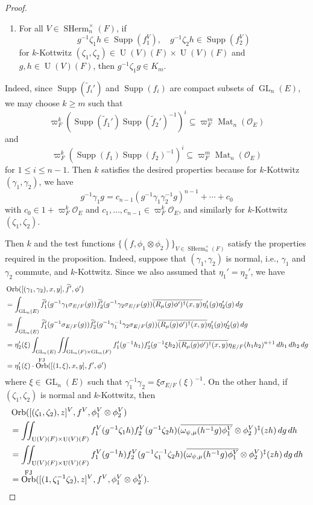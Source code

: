 \documentclass[11pt, reqno]{amsart}
\numberwithin{equation}{subsection}
\theoremstyle{plain}
\theoremstyle{definition}
\newcommand{\wt}{\widetilde}
\renewcommand{\O}{\mathcal O}
\newcommand{\ol}{\overline}
\DeclareMathOperator{\GL}{GL}
\DeclareMathOperator{\Mat}{Mat}
\DeclareMathOperator{\Orb}{Orb}
\DeclareMathOperator{\SHerm}{SHerm}
\DeclareMathOperator{\Supp}{Supp}
\DeclareMathOperator{\U}{U}
\newcommand{\FJ}{\textnormal{FJ}}
\begin{document}
\begin{proof}
\begin{enumerate}[(1)]
\item 
For all $V \in \SHerm_n^\times(F)$, if 
\[
    g^{-1}\zeta_1 h \in \Supp(f_1^V),\quad
    g^{-1}\zeta_2 h \in \Supp(f_2^V)
\]
for $k$-Kottwitz $(\zeta_1, \zeta_2)
\in \U(V)(F) \times \U(V)(F)$ and
$g, h \in \U(V)(F)$, 
then $g^{-1}\zeta_1 g \in K_m$.
\end{enumerate}
Indeed, since $\Supp(\wt f_i')$ 
and $\Supp(f_i)$ are compact subsets of $\GL_n(E)$,
we may choose $k \ge m$ such that
\[
    \varpi_F^k (\Supp(\wt f_1')\Supp(\wt
    f_2')^{-1})^i \subseteq \varpi_F^m \Mat_n(\O_E)
\]
and
\[
    \varpi_F^k (\Supp(f_1)\Supp(f_2)^{-1})^i
    \subseteq \varpi_F^m \Mat_n(\O_E)
\]
for $1 \le i \le n - 1$.
Then $k$ satisfies the desired properties because
for $k$-Kottwitz $(\gamma_1, \gamma_2)$, we have
\[
    g^{-1}\gamma_1 g
    = c_{n-1}(g^{-1}\gamma_1\gamma_2^{-1} g)^{n-1}
    + \cdots + c_0
\]
with $c_0 \in 1 + \varpi_F^k\O_E$
and $c_1, \dots, c_{n-1} \in \varpi_F^k\O_E$,
and similarly for $k$-Kottwitz $(\zeta_1, \zeta_2)$.

Then $k$ and the test functions 
$\{(f, \phi_1 \otimes \phi_2)\}_{V \in \SHerm_n^\times(F)}$ satisfy the
properties required in the proposition. 
Indeed, suppose that $(\gamma_1, \gamma_2)$
is normal, i.e., $\gamma_1$ and $\gamma_2$
commute, and $k$-Kottwitz. Since
we also assumed that $\eta_1' = \eta_2'$, we have
\begin{align*}
&\Orb([(\gamma_1, \gamma_2), x, y], \wt f', \phi') \\
&= \int_{\GL_n(E)} 
\wt f_1'(g^{-1}\gamma_1 \sigma_{E/F}(g)) 
\wt f_2'(g^{-1}\gamma_2 \sigma_{E/F}(g))
\ol{(R_\mu(g)\phi')^\dagger(x, y)}
\eta_1'(g)\eta_2'(g)\,dg\\
&= \int_{\GL_n(E)}
\wt f_1'(g^{-1}\sigma_{E/F}(g))
\wt f_2'(g^{-1}\gamma_1^{-1}\gamma_2\sigma_{E/F}(g))
\ol{(R_\mu(g)\phi')^\dagger(x, y)}
\eta_1'(g)\eta_2'(g)\, dg \\
&= \eta_2'(\xi)
\int_{\GL_n(E)}\iint_{\GL_n(F) \times \GL_n(F)}
f_1'(g^{-1}h_1) f_2'(g^{-1}\xi h_2)
\ol{(R_\mu(g)\phi')^\dagger(x, y)}
\eta_{E/F}(h_1h_2)^{n+1}\,dh_1\,dh_2\,dg\\
&= \eta_1'(\xi) \cdot
\Orb^{\FJ}([(1, \xi), x, y], f', \phi')
\end{align*}
where $\xi \in \GL_n(E)$ such that
$\gamma_1^{-1}\gamma_2 = \xi\sigma_{E/F}(\xi)^{-1}$.
On the other hand, if $(\zeta_1, \zeta_2)$
is normal and $k$-Kottwitz, then
\begin{align*}
&\Orb([(\zeta_1, \zeta_2), z]^V, f^V, \phi_1^V \otimes \phi_2^V)\\
&= \iint_{\U(V)(F)\times \U(V)(F)}
f_1^V(g^{-1}\zeta_1 h)f_2^V(g^{-1}\zeta_2 h)
(\ol{\omega_{\psi,\mu}(h^{-1}g)\phi_1^V} \otimes \phi_2^V)^\ddagger(zh)\,dg\,dh\\
&= \iint_{\U(V)(F) \times \U(V)(F)}
f_1^V(g^{-1}h)f_2^V(g^{-1}\zeta_1^{-1}\zeta_2 h)
(\ol{\omega_{\psi,\mu}(h^{-1}g)\phi_1^V} \otimes \phi_2^V)^\ddagger(zh)\,dg\,dh\\
&= \Orb^{\FJ}([(1, \zeta_1^{-1}\zeta_2), z]^V, f^V,
\phi_1^V \otimes \phi_2^V).
\end{align*}


\end{proof}
\end{document}
